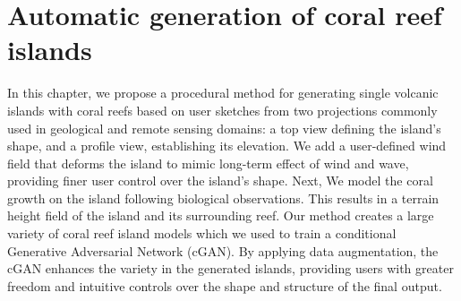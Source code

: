 \resetgraphicspath
{}

\chapter{Automatic generation of coral reef islands}
\label{chap:coral-island}

\abstract
In this chapter, we propose a procedural method for generating single volcanic islands with coral reefs based on user sketches from two projections commonly used in geological and remote sensing domains: a top view defining the island's shape, and a profile view, establishing its elevation. 
We add a user-defined wind field that deforms the island to mimic long-term effect of wind and wave, providing finer user control over the island's shape.
Next, We model the coral growth on the island following biological observations. %
This results in a terrain height field of the island and its surrounding reef.
Our method creates a large variety of coral reef island models which we used to train a conditional Generative Adversarial Network (cGAN). 
By applying data augmentation, the cGAN enhances the variety in the generated islands, providing users with greater freedom and intuitive controls over the shape and structure of the final output.
\pagebreak

